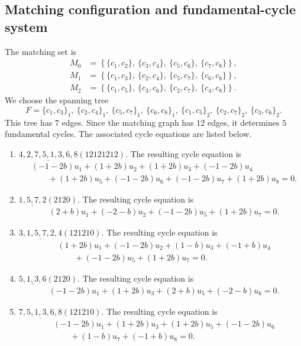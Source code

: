 \documentclass[11pt]{article}
\begin{document}
\subsection{Matching configuration and fundamental-cycle system}
The matching set is
\[
\begin{aligned}
M_0&=\left\{\{c_{1},c_{2}\},\ \{c_{3},c_{4}\},\ \{c_{5},c_{6}\},\ \{c_{7},c_{8}\}\right\},\\
M_1&=\left\{\{c_{1},c_{3}\},\ \{c_{2},c_{4}\},\ \{c_{5},c_{7}\},\ \{c_{6},c_{8}\}\right\},\\
M_2&=\left\{\{c_{1},c_{5}\},\ \{c_{3},c_{6}\},\ \{c_{2},c_{7}\},\ \{c_{4},c_{8}\}\right\}.
\end{aligned}
\]
We choose the spanning tree
\[
F={\{c_{1},c_{3}\}_{1},\ \{c_{2},c_{4}\}_{1},\ \{c_{5},c_{7}\}_{1},\ \{c_{6},c_{8}\}_{1},\ \{c_{1},c_{5}\}_{2},\ \{c_{2},c_{7}\}_{2},\ \{c_{3},c_{6}\}_{2}}.
\]
This tree has $7$ edges.  Since the matching graph has $12$ edges, it determines $5$ fundamental cycles.  The associated cycle equations are listed below.
\begin{enumerate}[label=(\arabic*)]
\item $ \underline{4,2,7,5,1,3,6,8}(12121212) $.  The resulting cycle equation is
\[
\begin{aligned}
&\left(-1 - 2b\right)u_{1} + \left(1 + 2b\right)u_{2} + \left(1 + 2b\right)u_{3} + \left(-1 - 2b\right)u_{4}\\ &\qquad  + \left(1 + 2b\right)u_{5} + \left(-1 - 2b\right)u_{6} + \left(-1 - 2b\right)u_{7} + \left(1 + 2b\right)u_{8}=0.
\end{aligned}
\]
\item $ \underline{1,5,7,2}(2120) $.  The resulting cycle equation is
\[
\begin{aligned}
&\left(2 + b\right)u_{1} + \left(-2 - b\right)u_{2} + \left(-1 - 2b\right)u_{5} + \left(1 + 2b\right)u_{7}=0.
\end{aligned}
\]
\item $ \underline{3,1,5,7,2,4}(121210) $.  The resulting cycle equation is
\[
\begin{aligned}
&\left(1 + 2b\right)u_{1} + \left(-1 - 2b\right)u_{2} + \left(1 - b\right)u_{3} + \left(-1 + b\right)u_{4}\\ &\qquad  + \left(-1 - 2b\right)u_{5} + \left(1 + 2b\right)u_{7}=0.
\end{aligned}
\]
\item $ \underline{5,1,3,6}(2120) $.  The resulting cycle equation is
\[
\begin{aligned}
&\left(-1 - 2b\right)u_{1} + \left(1 + 2b\right)u_{3} + \left(2 + b\right)u_{5} + \left(-2 - b\right)u_{6}=0.
\end{aligned}
\]
\item $ \underline{7,5,1,3,6,8}(121210) $.  The resulting cycle equation is
\[
\begin{aligned}
&\left(-1 - 2b\right)u_{1} + \left(1 + 2b\right)u_{3} + \left(1 + 2b\right)u_{5} + \left(-1 - 2b\right)u_{6}\\ &\qquad  + \left(1 - b\right)u_{7} + \left(-1 + b\right)u_{8}=0.
\end{aligned}
\]
\end{enumerate}
\end{document}
